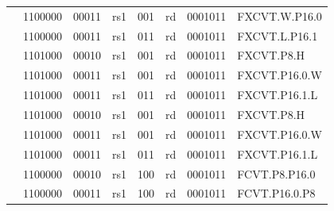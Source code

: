 \begin{table}
\begin{small}
\begin{center}
\begin{tabular}{p{0in}p{0.4in}p{0.05in}p{0.05in}p{0.05in}p{0.05in}p{0.4in}p{0.6in}p{0.4in}p{0.6in}p{0.7in}l}
&
\multicolumn{4}{|c|}{1100000} &
\multicolumn{2}{c|}{00011} &
\multicolumn{1}{c|}{rs1} &
\multicolumn{1}{c|}{001} &
\multicolumn{1}{c|}{rd} &
\multicolumn{1}{c|}{0001011} & FXCVT.W.P16.0 \\
\cline{2-11}


&
\multicolumn{4}{|c|}{1100000} &
\multicolumn{2}{c|}{00011} &
\multicolumn{1}{c|}{rs1} &
\multicolumn{1}{c|}{011} &
\multicolumn{1}{c|}{rd} &
\multicolumn{1}{c|}{0001011} & FXCVT.L.P16.1 \\
\cline{2-11}


&
\multicolumn{4}{|c|}{1101000} &
\multicolumn{2}{c|}{00010} &
\multicolumn{1}{c|}{rs1} &
\multicolumn{1}{c|}{001} &
\multicolumn{1}{c|}{rd} &
\multicolumn{1}{c|}{0001011} & FXCVT.P8.H \\
\cline{2-11}


&
\multicolumn{4}{|c|}{1101000} &
\multicolumn{2}{c|}{00011} &
\multicolumn{1}{c|}{rs1} &
\multicolumn{1}{c|}{001} &
\multicolumn{1}{c|}{rd} &
\multicolumn{1}{c|}{0001011} & FXCVT.P16.0.W \\
\cline{2-11}


&
\multicolumn{4}{|c|}{1101000} &
\multicolumn{2}{c|}{00011} &
\multicolumn{1}{c|}{rs1} &
\multicolumn{1}{c|}{011} &
\multicolumn{1}{c|}{rd} &
\multicolumn{1}{c|}{0001011} & FXCVT.P16.1.L \\
\cline{2-11}


&
\multicolumn{4}{|c|}{1101000} &
\multicolumn{2}{c|}{00010} &
\multicolumn{1}{c|}{rs1} &
\multicolumn{1}{c|}{001} &
\multicolumn{1}{c|}{rd} &
\multicolumn{1}{c|}{0001011} & FXCVT.P8.H \\
\cline{2-11}


&
\multicolumn{4}{|c|}{1101000} &
\multicolumn{2}{c|}{00011} &
\multicolumn{1}{c|}{rs1} &
\multicolumn{1}{c|}{001} &
\multicolumn{1}{c|}{rd} &
\multicolumn{1}{c|}{0001011} & FXCVT.P16.0.W \\
\cline{2-11}


&
\multicolumn{4}{|c|}{1101000} &
\multicolumn{2}{c|}{00011} &
\multicolumn{1}{c|}{rs1} &
\multicolumn{1}{c|}{011} &
\multicolumn{1}{c|}{rd} &
\multicolumn{1}{c|}{0001011} & FXCVT.P16.1.L \\
\cline{2-11}


&
\multicolumn{4}{|c|}{1100000} &
\multicolumn{2}{c|}{00010} &
\multicolumn{1}{c|}{rs1} &
\multicolumn{1}{c|}{100} &
\multicolumn{1}{c|}{rd} &
\multicolumn{1}{c|}{0001011} & FCVT.P8.P16.0 \\
\cline{2-11}


&
\multicolumn{4}{|c|}{1100000} &
\multicolumn{2}{c|}{00011} &
\multicolumn{1}{c|}{rs1} &
\multicolumn{1}{c|}{100} &
\multicolumn{1}{c|}{rd} &
\multicolumn{1}{c|}{0001011} & FCVT.P16.0.P8 \\
\cline{2-11}



\end{tabular}
\end{center}
\end{small}
\end{table}
